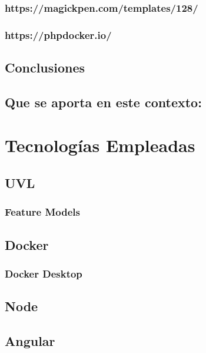 \documentclass[12pt, a4paper, twoside]{article}
\begin{document}
\subsubsection{https://magickpen.com/templates/128/}
\subsubsection{https://phpdocker.io/}
\blindtext

\subsection{Conclusiones}
\blindtext

\subsection{Que se aporta en este contexto:}
\blindtext













\section{Tecnologías Empleadas}

\subsection{UVL}
\subsubsection{Feature Models}

\subsection{Docker}
\subsubsection{Docker Desktop}

\subsection{Node}
\subsection{Angular}
\end{document}
